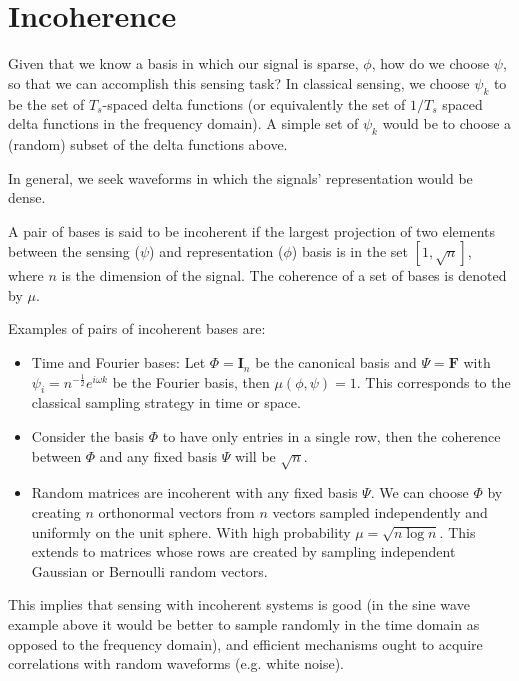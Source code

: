 \section{Incoherence}
Given that we know a basis in which our signal is sparse, \(\phi\), how do we choose \(\psi\), so that we can accomplish this sensing task? In classical sensing, we choose \(\psi_k\) to be the set of \( T_s \)-spaced delta functions (or equivalently the set of \( 1/T_s \) spaced delta functions in the frequency domain). A simple set of \(\psi_k\) would be to choose a (random) subset of the delta functions above.

In general, we seek waveforms in which the signals' representation would be dense.

\begin{definition}[Incoherence]
A pair of bases is said to be incoherent if the largest projection of two elements between the sensing (\(\psi\)) and representation (\(\phi\)) basis  is in the set \( [1 , \sqrt{n}] \), where \( n \) is the dimension of the signal. The coherence of a set of bases is denoted by \(\mu\).
\end{definition}

Examples of pairs of incoherent bases are:

\begin{itemize}
\item Time and Fourier bases: Let \(\Phi = \textbf{I}_n\) be the canonical basis and \(\Psi = \textbf{F}\) with \(\psi_i = n^{-\frac{1}{2}}e^{i\omega k} \) be the Fourier basis, then \(\mu\left(\phi, \psi\right) = 1\). This corresponds to the classical sampling strategy in time or space.
\item Consider the basis \(\Phi\) to have only entries in a single row, then the coherence between \(\Phi\) and any fixed basis \(\Psi\) will be \(\sqrt{n}\).
\item Random matrices are incoherent with any fixed basis \(\Psi\). We can choose \(\Phi\) by creating \(n\) orthonormal vectors from \(n\) vectors sampled independently and uniformly on the unit sphere. With high probability \(\mu = \sqrt{n\log{n}}\). This extends to matrices whose rows are created by sampling independent Gaussian or Bernoulli random vectors.
\end{itemize}

This implies that sensing with incoherent systems is good (in the sine wave example above it would be better to sample randomly in the time domain as opposed to the frequency domain), and efficient mechanisms ought to acquire correlations with random waveforms (e.g. white noise).

